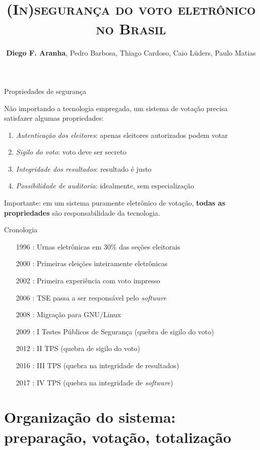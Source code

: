 \documentclass[10pt]{beamer}
\title{\textsc{(In)segurança do voto eletrônico no Brasil}}
\date{}
\author{\textbf{Diego F. Aranha}, Pedro Barbosa, Thiago Cardoso, Caio Lüders, Paulo Matias}
\institute{Unicamp, UFCG, Hekima, UFPE, UFSCar}
\begin{document}
\maketitle

\begin{frame}{Propriedades de segurança}

Não importando a tecnologia empregada, um sistema de votação precisa satisfazer algumas propriedades:
\begin{enumerate}
 \item \emph{Autenticação dos eleitores}: apenas eleitores autorizados podem votar
 \item \emph{Sigilo do voto}: voto deve ser secreto
 \item \emph{Integridade dos resultados}: resultado é justo
 \item \emph{Possibilidade de auditoria}: idealmente, sem especialização
\end{enumerate}

\alert{Importante:} em um sistema puramente eletrônico de votação, {\bf todas as propriedades} são responsabilidade da tecnologia.

\end{frame}


\begin{frame}{Cronologia}
 
\begin{enumerate}
 \item[\alert{1996}]: Urnas eletrônicas em 30\% das seções eleitorais
 \item[\alert{2000}]: Primeiras eleições inteiramente eletrônicas
 \item[\alert{2002}]: Primeira experiência com voto impresso
 \item[\alert{2006}]: TSE passa a ser responsável pelo \emph{software}
 \item[\alert{2008}]: Migração para GNU/Linux
 \item[\alert{2009}]: I Testes Públicos de Segurança (quebra de sigilo do voto)
 \item[\alert{2012}]: II TPS (quebra de sigilo do voto)
 \item[\alert{2016}]: III TPS (quebra na integridade de resultados)
 \item[\alert{2017}]: IV TPS (quebra na integridade de \emph{software})
\end{enumerate}
 

\end{frame}

\section{Organização do sistema:\\ preparação, votação, totalização}
\end{document}

